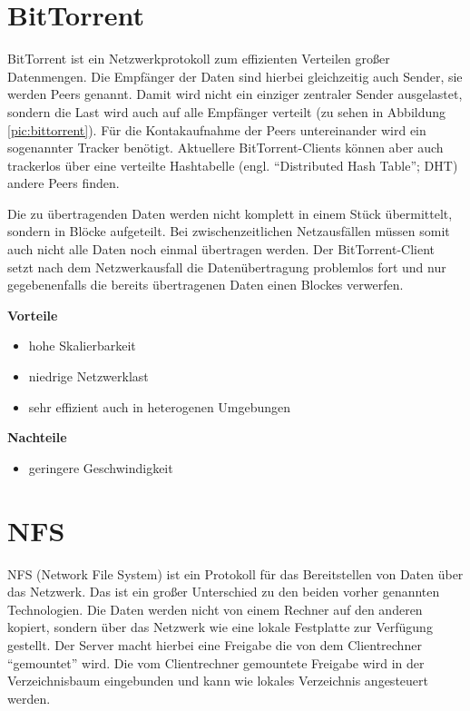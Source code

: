 \section{BitTorrent}
BitTorrent ist ein Netzwerkprotokoll zum effizienten Verteilen großer Datenmengen. Die Empfänger der Daten sind hierbei gleichzeitig auch Sender, sie werden Peers genannt. Damit wird nicht ein einziger zentraler Sender ausgelastet, sondern die Last wird auch auf alle Empfänger verteilt (zu sehen in Abbildung \ref{pic:bittorrent}). Für die Kontakaufnahme der Peers untereinander wird ein sogenannter Tracker benötigt. Aktuellere BitTorrent-Clients können aber auch trackerlos über eine verteilte Hashtabelle (engl. ``Distributed Hash Table''; DHT) andere Peers finden. 

Die zu übertragenden Daten werden nicht komplett in einem Stück übermittelt, sondern in Blöcke aufgeteilt. Bei zwischenzeitlichen Netzausfällen müssen somit auch nicht alle Daten noch einmal übertragen werden. Der BitTorrent-Client setzt nach dem Netzwerkausfall die Datenübertragung problemlos fort und nur gegebenenfalls die bereits übertragenen Daten einen Blockes verwerfen.


\textbf{Vorteile}
\begin{itemize}
 \item hohe Skalierbarkeit
 \item niedrige Netzwerklast
 \item sehr effizient auch in heterogenen Umgebungen
\end{itemize}

\textbf{Nachteile}
\begin{itemize}
 \item geringere Geschwindigkeit
\end{itemize}

\section{NFS}
NFS (Network File System) ist ein Protokoll für das Bereitstellen von Daten über das Netzwerk. Das ist ein großer Unterschied zu den beiden vorher genannten Technologien. Die Daten werden nicht von einem Rechner auf den anderen kopiert, sondern über das Netzwerk wie eine lokale Festplatte zur Verfügung gestellt. Der Server macht hierbei eine Freigabe die von dem Clientrechner ``gemountet'' wird. Die vom Clientrechner gemountete Freigabe wird in der Verzeichnisbaum eingebunden und kann wie lokales Verzeichnis angesteuert werden.


